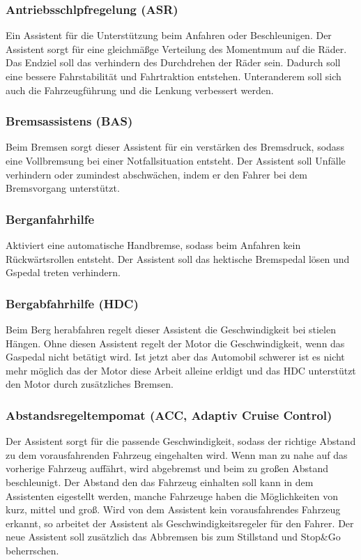         \subsubsection{Antriebsschlpfregelung (ASR)}
        Ein Assistent für die Unterstützung beim Anfahren oder Beschleunigen. Der
        Assistent sorgt für eine gleichmäßge Verteilung des Momentmum auf die Räder.
        Das Endziel soll das verhindern des Durchdrehen der Räder sein. Dadurch soll eine 
        bessere Fahrstabilität und Fahrtraktion entstehen. Unteranderem soll sich auch 
        die Fahrzeugführung und die Lenkung verbessert werden.

        \subsubsection{Bremsassistens (BAS)}
        Beim Bremsen sorgt dieser Assistent für ein verstärken des Bremsdruck, sodass
        eine Vollbremsung bei einer Notfallsituation entsteht. Der Assistent soll Unfälle 
        verhindern oder zumindest abschwächen, indem er den Fahrer bei dem Bremsvorgang 
        unterstützt.

        \subsubsection{Berganfahrhilfe}
        Aktiviert eine automatische Handbremse, sodass beim Anfahren kein Rückwärtsrollen
        entsteht. Der Assistent soll das hektische Bremspedal lösen und Gspedal treten 
        verhindern.
        
        \subsubsection{Bergabfahrhilfe (HDC)}
        Beim Berg herabfahren regelt dieser Assistent die Geschwindigkeit bei stielen Hängen. 
        Ohne diesen Assistent regelt der Motor die Geschwindigkeit, wenn das Gaspedal nicht 
        betätigt wird. Ist jetzt aber das Automobil schwerer ist es nicht mehr möglich das 
        der Motor diese Arbeit alleine erldigt und das HDC unterstützt den Motor durch 
        zusätzliches Bremsen.

        \subsubsection{Abstandsregeltempomat (ACC, Adaptiv Cruise Control)}
        Der Assistent sorgt für die passende Geschwindigkeit, sodass der richtige Abstand
        zu dem vorausfahrenden Fahrzeug eingehalten wird. Wenn man zu nahe auf das vorherige
        Fahrzeug auffährt, wird abgebremst und beim zu großen Abstand beschleunigt. Der Abstand
        den das Fahrzeug einhalten soll kann in dem Assistenten eigestellt werden, manche Fahrzeuge
        haben die Möglichkeiten von kurz, mittel und groß. Wird von dem Assistent kein vorausfahrendes
        Fahrzeug erkannt, so arbeitet der Assistent als Geschwindigkeitsregeler für den Fahrer. Der
        neue Assistent soll zusätzlich das Abbremsen bis zum Stillstand und Stop\&Go beherrschen.
        
